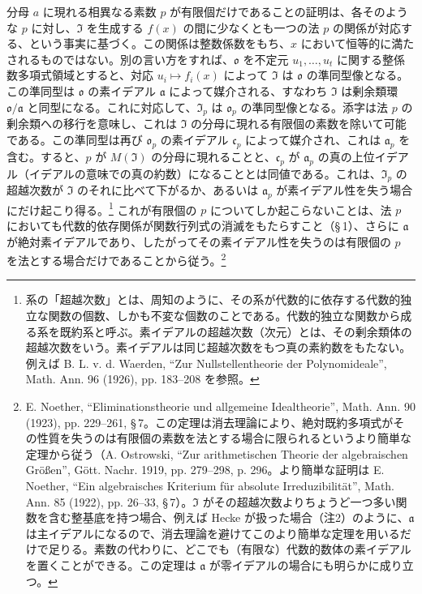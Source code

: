 分母 $a$ に現れる相異なる素数 $p$ が有限個だけであることの証明は、各そのような $p$ に対し、$\mathfrak{I}$ を生成する $f(x)$ の間に少なくとも一つの法 $p$ の関係が対応する、という事実に基づく。この関係は整数係数をもち、$x$ において恒等的に満たされるものではない。別の言い方をすれば、$\mathfrak{o}$ を不定元 $u_1,\ldots,u_t$ に関する整係数多項式領域とすると、対応 $u_i\mapsto f_i(x)$ によって $\mathfrak{I}$ は $\mathfrak{o}$ の準同型像となる。この準同型は $\mathfrak{o}$ の素イデアル $\mathfrak{a}$ によって媒介される、すなわち $\mathfrak{I}$ は剰余類環 $\mathfrak{o}/\mathfrak{a}$ と同型になる。これに対応して、$\mathfrak{I}_p$ は $\mathfrak{o}_p$ の準同型像となる。添字は法 $p$ の剰余類への移行を意味し、これは $\mathfrak{I}$ の分母に現れる有限個の素数を除いて可能である。この準同型は再び $\mathfrak{o}_p$ の素イデアル $\mathfrak{c}_p$ によって媒介され、これは $\mathfrak{a}_p$ を含む。すると、$p$ が $M(\mathfrak{I})$ の分母に現れることと、$\mathfrak{c}_p$ が $\mathfrak{a}_p$ の真の上位イデアル（イデアルの意味での真の約数）になることとは同値である。これは、$\mathfrak{I}_p$ の超越次数が $\mathfrak{I}$ のそれに比べて下がるか、あるいは $\mathfrak{a}_p$ が素イデアル性を失う場合にだけ起こり得る。\footnote{系の「超越次数」とは、周知のように、その系が代数的に依存する代数的独立な関数の個数、しかも不変な個数のことである。代数的独立な関数から成る系を既約系と呼ぶ。素イデアルの超越次数（次元）とは、その剰余類体の超越次数をいう。素イデアルは同じ超越次数をもつ真の素約数をもたない。例えば B. L. v. d. Waerden, ``Zur Nullstellentheorie der Polynomideale'', Math. Ann. 96 (1926), pp. 183--208 を参照。} これが有限個の $p$ についてしか起こらないことは、法 $p$ においても代数的依存関係が関数行列式の消滅をもたらすこと（\S\,1）、さらに $\mathfrak{a}$ が絶対素イデアルであり、したがってその素イデアル性を失うのは有限個の $p$ を法とする場合だけであることから従う。\footnote{E. Noether, ``Eliminationstheorie und allgemeine Idealtheorie'', Math. Ann. 90 (1923), pp. 229--261, \S\,7。この定理は消去理論により、絶対既約多項式がその性質を失うのは有限個の素数を法とする場合に限られるというより簡単な定理から従う（A. Ostrowski, ``Zur arithmetischen Theorie der algebraischen Größen'', Gött. Nachr. 1919, pp. 279--298, p. 296。より簡単な証明は E. Noether, ``Ein algebraisches Kriterium für absolute Irreduzibilität'', Math. Ann. 85 (1922), pp. 26--33, \S\,7）。$\mathfrak{I}$ がその超越次数よりちょうど一つ多い関数を含む整基底を持つ場合、例えば Hecke が扱った場合（注2）のように、$\mathfrak{a}$ は主イデアルになるので、消去理論を避けてこのより簡単な定理を用いるだけで足りる。素数の代わりに、どこでも（有限な）代数的数体の素イデアルを置くことができる。この定理は $\mathfrak{a}$ が零イデアルの場合にも明らかに成り立つ。}

